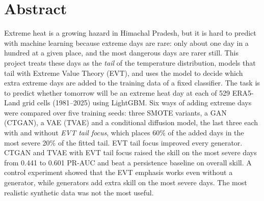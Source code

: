 \documentclass[12pt,a4paper]{report}
\begin{document}
\chapter*{Abstract}
Extreme heat is a growing hazard in Himachal Pradesh, but it is hard to predict with machine learning because
extreme days are rare: only about one day in a hundred at a given place, and the most dangerous days are rarer still.
This project treats these days as the \emph{tail} of the temperature distribution, models that tail with Extreme
Value Theory (EVT), and uses the model to decide which extra extreme days are added to the training data of a fixed
classifier. The task is to predict whether tomorrow will be an extreme heat day at each of 529 ERA5-Land grid cells
(1981--2025) using LightGBM. Six ways of adding extreme days were compared over five training seeds: three SMOTE variants,
a GAN (CTGAN), a VAE (TVAE) and a conditional diffusion model, the last three each with and without \emph{EVT tail focus}, which places 60\% of the
added days in the most severe 20\% of the fitted tail. EVT tail focus improved every generator. CTGAN and TVAE with
EVT tail focus raised the skill on the most severe days from 0.441 to 0.601 PR-AUC and beat a persistence baseline on
overall skill. A control experiment showed that the EVT emphasis works even without a generator, while generators add
extra skill on the most severe days. The most realistic synthetic data was not the most useful.

\tableofcontents
\listoffigures
\listoftables

\end{document}
